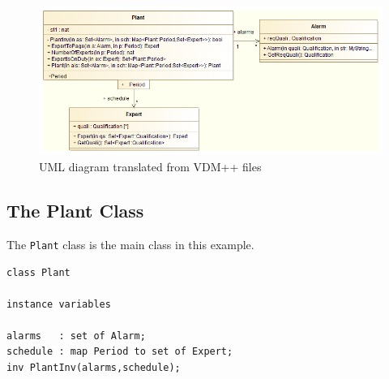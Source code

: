 \begin{figure}[!h]
\begin{center}
  \includegraphics[width=5in]{figures/FullUMLClassDiagram}
  \caption[labelInTOC]{UML diagram translated from VDM++ files}
  \label{fig:finalumlforalarm}
\end{center}
\end{figure}


\subsection{The Plant Class}

The \texttt{Plant} class is the main class in this example.

\begin{lstlisting}
class Plant

instance variables

alarms   : set of Alarm;
schedule : map Period to set of Expert;
inv PlantInv(alarms,schedule);
\end{lstlisting}

